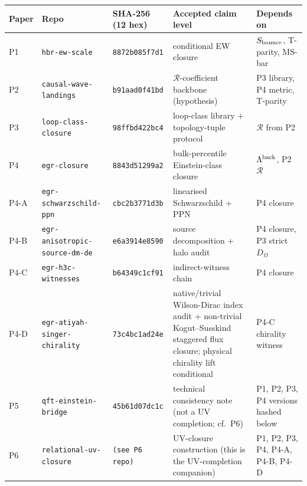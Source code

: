 \setlength{\tabcolsep}{2.5pt}\scriptsize
\begin{tabular}{l p{} l p{} p{}}
\toprule
Paper & Repo & SHA-256 (12 hex) & Accepted claim level & Depends on \\
\midrule
P1 & \texttt{hbr-ew-scale} & \texttt{8872b085f7d1} & conditional EW closure & $S_{\rm bounce}$, T-parity, MS-bar \\
P2 & \texttt{causal-wave-landings} & \texttt{b91aad0f41bd} & $\mathcal R$-coefficient backbone (hypothesis) & P3 library, P4 metric, T-parity \\
P3 & \texttt{loop-class-closure} & \texttt{98ffbd422bc4} & loop-class library + topology-tuple protocol & $\mathcal R$ from P2 \\
P4 & \texttt{egr-closure} & \texttt{8843d51299a2} & bulk-percentile Einstein-class closure & $\Lambda^{\rm back}$, P2 $\mathcal R$ \\
P4-A & \texttt{egr-schwarzschild-ppn} & \texttt{cbc2b3771d3b} & linearised Schwarzschild + PPN & P4 closure \\
P4-B & \texttt{egr-anisotropic-source-dm-de} & \texttt{e6a3914e8590} & source decomposition + halo audit & P4 closure, P3 strict $D_\Omega$ \\
P4-C & \texttt{egr-h3c-witnesses} & \texttt{b64349c1cf91} & indirect-witness chain & P4 closure \\
P4-D & \texttt{egr-atiyah-singer-chirality} & \texttt{73c4bc1ad24e} & native/trivial Wilson-Dirac index audit + non-trivial Kogut--Susskind staggered flux closure; physical chirality lift conditional & P4-C chirality witness \\
P5 & \texttt{qft-einstein-bridge} & \texttt{45b61d07dc1c} & technical consistency note (not a UV completion; cf.\ P6) & P1, P2, P3, P4 versions hashed below \\
P6 & \texttt{relational-uv-closure} & \texttt{(see P6 repo)} & UV-closure construction (this is the UV-completion companion) & P1, P2, P3, P4, P4-A, P4-B, P4-D \\
\bottomrule
\end{tabular}